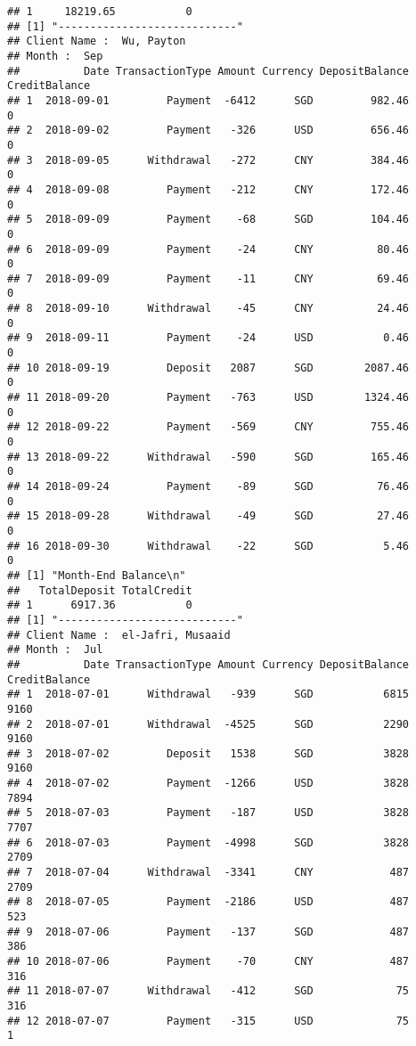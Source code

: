 \documentclass[]{article}
\begin{document}
\begin{verbatim}
## 1     18219.65           0
## [1] "----------------------------"
## Client Name :  Wu, Payton 
## Month :  Sep 
##          Date TransactionType Amount Currency DepositBalance CreditBalance
## 1  2018-09-01         Payment  -6412      SGD         982.46             0
## 2  2018-09-02         Payment   -326      USD         656.46             0
## 3  2018-09-05      Withdrawal   -272      CNY         384.46             0
## 4  2018-09-08         Payment   -212      CNY         172.46             0
## 5  2018-09-09         Payment    -68      SGD         104.46             0
## 6  2018-09-09         Payment    -24      CNY          80.46             0
## 7  2018-09-09         Payment    -11      CNY          69.46             0
## 8  2018-09-10      Withdrawal    -45      CNY          24.46             0
## 9  2018-09-11         Payment    -24      USD           0.46             0
## 10 2018-09-19         Deposit   2087      SGD        2087.46             0
## 11 2018-09-20         Payment   -763      USD        1324.46             0
## 12 2018-09-22         Payment   -569      CNY         755.46             0
## 13 2018-09-22      Withdrawal   -590      SGD         165.46             0
## 14 2018-09-24         Payment    -89      SGD          76.46             0
## 15 2018-09-28      Withdrawal    -49      SGD          27.46             0
## 16 2018-09-30      Withdrawal    -22      SGD           5.46             0
## [1] "Month-End Balance\n"
##   TotalDeposit TotalCredit
## 1      6917.36           0
## [1] "----------------------------"
## Client Name :  el-Jafri, Musaaid 
## Month :  Jul 
##          Date TransactionType Amount Currency DepositBalance CreditBalance
## 1  2018-07-01      Withdrawal   -939      SGD           6815          9160
## 2  2018-07-01      Withdrawal  -4525      SGD           2290          9160
## 3  2018-07-02         Deposit   1538      SGD           3828          9160
## 4  2018-07-02         Payment  -1266      USD           3828          7894
## 5  2018-07-03         Payment   -187      USD           3828          7707
## 6  2018-07-03         Payment  -4998      SGD           3828          2709
## 7  2018-07-04      Withdrawal  -3341      CNY            487          2709
## 8  2018-07-05         Payment  -2186      USD            487           523
## 9  2018-07-06         Payment   -137      SGD            487           386
## 10 2018-07-06         Payment    -70      CNY            487           316
## 11 2018-07-07      Withdrawal   -412      SGD             75           316
## 12 2018-07-07         Payment   -315      USD             75             1

\end{verbatim}
\end{document}
